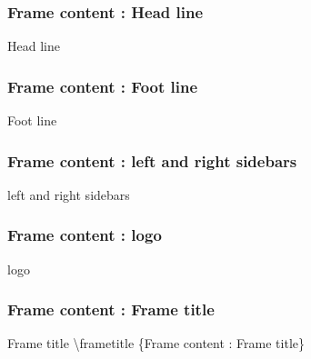 \documentclass[10pt,blue,xcolor=pdftex,dvipsnames,table,handout]{beamer}
\begin{document}
		\begin{frame}
		\frametitle{Frame content : Head line}

			\begin{block} {Head line}
			\end{block}

		\end{frame}

		\begin{frame}
		\frametitle{Frame content : Foot line}

			\begin{block} {Foot line}
			\end{block}

		\end{frame}

		\begin{frame}
		\frametitle{Frame content : left and right sidebars}

			\begin{block} {left and right sidebars}
			\end{block}

		\end{frame}


		\begin{frame}
		\frametitle{Frame content : logo}

			\begin{block} {logo}
			\end{block}

		\end{frame}

		\begin{frame}
		\frametitle{Frame content : Frame title}

			\begin{block} {Frame title}
			\textbackslash frametitle \{Frame content : Frame title\}

			\end{block}

		\end{frame}
\end{document}
